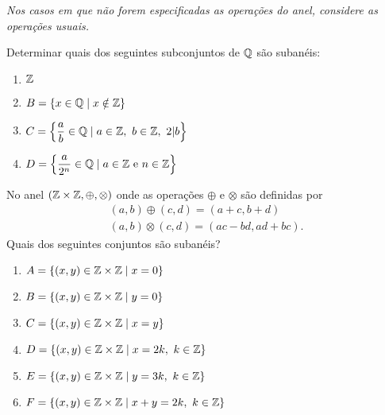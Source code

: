 \documentclass[12pt]{exam}
\begin{document}
    \vspace{1cm}
    
    \textit{Nos casos em que n\~ao forem especificadas as opera\c{c}\~oes do anel, considere as opera\c{c}\~oes usuais.}

    \vspace{.6cm}

    \questao{} Determinar quais dos seguintes subconjuntos de $\mathbb{Q}$ s{\~a}o suban{\'e}is:
        \begin{multicols}{2}
            \begin{enumerate}[label=({\alph*})]
                \item $\mathbb{Z}$
                \item $B = \{x \in \mathbb{Q} \mid x \notin \mathbb{Z}\}$
                \item $C = \left\{\dfrac{a}{b} \in \mathbb{Q} \mid a \in \mathbb{Z},\ b \in \mathbb{Z},\ 2 |b \right\}$
                \item $D = \left\{\dfrac{a}{2^n} \in \mathbb{Q} \mid a \in \mathbb{Z} \mbox{ e } n \in \mathbb{Z} \right\}$
            \end{enumerate}
        \end{multicols}
     

    \vspace{.3cm}

    \questao{} No anel $(\mathbb{Z} \times \mathbb{Z}, \oplus, \otimes)$ onde as opera\c{c}\~oes $\oplus$ e $\otimes$ s\~ao definidas por
    \begin{align*}
        (a, b) \oplus (c, d) = (a + c, b + d)\\
        (a ,b) \otimes (c, d) = (ac - bd, ad + bc).
    \end{align*}
    Quais dos seguintes conjuntos s\~ao suban\'eis?
    \begin{enumerate}[label=({\alph*})]
        \item $A = \{(x, y) \in \mathbb{Z} \times \mathbb{Z} \mid x = 0\}$
        \item $B = \{(x, y) \in \mathbb{Z} \times \mathbb{Z} \mid y = 0\}$
        \item $C = \{(x, y) \in \mathbb{Z} \times \mathbb{Z} \mid x = y\}$
        \item $D = \{(x, y) \in \mathbb{Z} \times \mathbb{Z} \mid x = 2k,\ k \in \mathbb{Z}\}$
        \item $E = \{(x, y) \in \mathbb{Z} \times \mathbb{Z} \mid y = 3k,\ k \in \mathbb{Z}\}$
        \item $F = \{(x, y) \in \mathbb{Z} \times \mathbb{Z} \mid x + y = 2k,\ k \in \mathbb{Z}\}$
    \end{enumerate}

    \vspace{.3cm}
\end{document}
